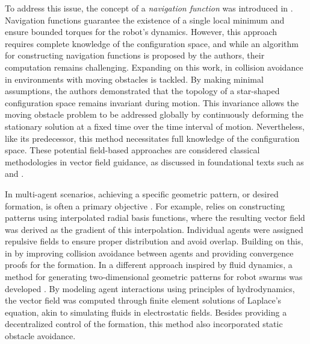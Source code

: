 To address this issue, the concept of a \emph{navigation function} was introduced in \citet{Rimon1992}. Navigation functions guarantee the existence of a single local minimum and ensure bounded torques for the robot's dynamics. However, this approach requires complete knowledge of the configuration space, and while an algorithm for constructing navigation functions is proposed by the authors, their computation remains challenging. Expanding on this work, in \citet{Conn1998} collision avoidance in environments with moving obstacles is tackled. By making minimal assumptions, the authors demonstrated that the topology of a star-shaped configuration space remains invariant during motion. This invariance allows the moving obstacle problem to be addressed globally by continuously deforming the stationary solution at a fixed time over the time interval of motion. Nevertheless, like its predecessor, this method necessitates full knowledge of the configuration space.  These potential field-based approaches are considered classical methodologies in vector field guidance, as discussed in foundational texts such as \citet[p. 77]{Choset2005} and \citet[p. 299]{Spong2020}.

In multi-agent scenarios, achieving a specific geometric pattern, or desired formation, is often a primary objective \citep{Chaimowicz2005,Mong-yingA.Hsieh2006,Pimenta2007}. For example,  \citet{Chaimowicz2005} relies on constructing patterns using interpolated radial basis functions, where the resulting vector field was derived as the gradient of this interpolation. Individual agents were assigned repulsive fields to ensure proper distribution and avoid overlap. Building on this, in \citet{Mong-yingA.Hsieh2006}  by improving collision avoidance between agents and providing convergence proofs for the formation. In a different approach inspired by fluid dynamics, a method for generating two-dimensional geometric patterns for robot swarms was developed \citep{Pimenta2007}. By modeling agent interactions using principles of hydrodynamics, the vector field was computed through finite element solutions of Laplace's equation, akin to simulating fluids in electrostatic fields. Besides providing a decentralized control of the formation, this method also incorporated static obstacle avoidance.

